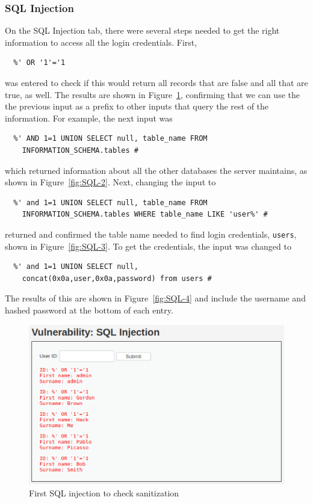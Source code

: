 \documentclass[11pt]{article}
\begin{document}
\subsubsection*{SQL Injection}
On the SQL Injection tab, there were several steps needed to get the right information to access all the login credentials. First,
\begin{verbatim}
  %' OR '1'='1
\end{verbatim}
was entered to check if this would return all records that are false and all that are true, as well. The results are shown in
Figure~\ref{fig:SQL-1}, confirming that we can use the the previous input as a prefix to other inputs that query the rest of the
information. For example, the next input was
\begin{verbatim}
  %' AND 1=1 UNION SELECT null, table_name FROM
    INFORMATION_SCHEMA.tables #
\end{verbatim}
which returned information about all the other databases the server maintains, as shown in Figure~\ref{fig:SQL-2}. Next, changing the
input to
\begin{verbatim}
  %' and 1=1 UNION SELECT null, table_name FROM
    INFORMATION_SCHEMA.tables WHERE table_name LIKE 'user%' #
\end{verbatim}
returned and confirmed the table name needed to find login credentials, \verb|users|, shown in Figure~\ref{fig:SQL-3}. To get the
credentials, the input was changed to
\begin{verbatim}
  %' and 1=1 UNION SELECT null,
    concat(0x0a,user,0x0a,password) from users #
\end{verbatim}
The results of this are shown in Figure~\ref{fig:SQL-4} and include the username and hashed password at the bottom of each entry.
\begin{figure}[htbp]
  \centering
  \includegraphics[width=1\linewidth]{./SQL-1.png}
  \caption{\label{fig:SQL-1}
  First SQL injection to check sanitization}
\end{figure}
\end{document}
